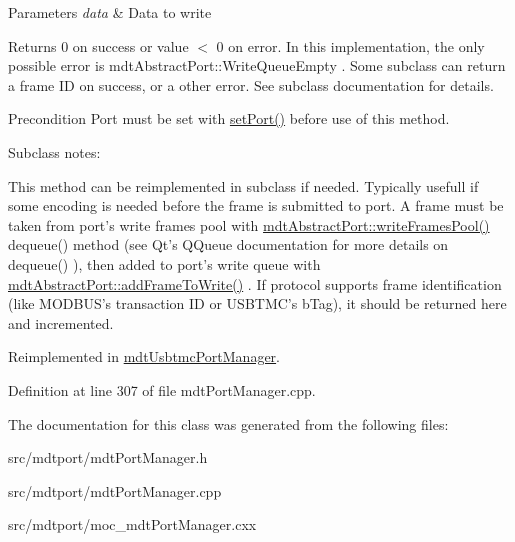 \begin{DoxyParams}{Parameters}
{\em data} & Data to write \\
\hline
\end{DoxyParams}
\begin{DoxyReturn}{Returns}
0 on success or value $<$ 0 on error. In this implementation, the only possible error is mdtAbstractPort::WriteQueueEmpty . Some subclass can return a frame ID on success, or a other error. See subclass documentation for details. 
\end{DoxyReturn}
\begin{DoxyPrecond}{Precondition}
Port must be set with \hyperlink{classmdt_port_manager_afcd156b2d0c9d340999935efb6cd8cb6}{setPort()} before use of this method.
\end{DoxyPrecond}
Subclass notes:\par
 This method can be reimplemented in subclass if needed. Typically usefull if some encoding is needed before the frame is submitted to port. A frame must be taken from port's write frames pool with \hyperlink{classmdt_abstract_port_abf093b67fddebffa4f3c52277b9a8cf7}{mdtAbstractPort::writeFramesPool()} dequeue() method (see Qt's QQueue documentation for more details on dequeue() ), then added to port's write queue with \hyperlink{classmdt_abstract_port_a9a69eb2fc07d551ab37c011487fa319d}{mdtAbstractPort::addFrameToWrite()} . If protocol supports frame identification (like MODBUS's transaction ID or USBTMC's bTag), it should be returned here and incremented. 

Reimplemented in \hyperlink{classmdt_usbtmc_port_manager_ab7229e9d519e80a6509bec90dc9239b3}{mdtUsbtmcPortManager}.



Definition at line 307 of file mdtPortManager.cpp.



The documentation for this class was generated from the following files:\begin{DoxyCompactItemize}
\item 
src/mdtport/mdtPortManager.h\item 
src/mdtport/mdtPortManager.cpp\item 
src/mdtport/moc\_\-mdtPortManager.cxx\end{DoxyCompactItemize}
